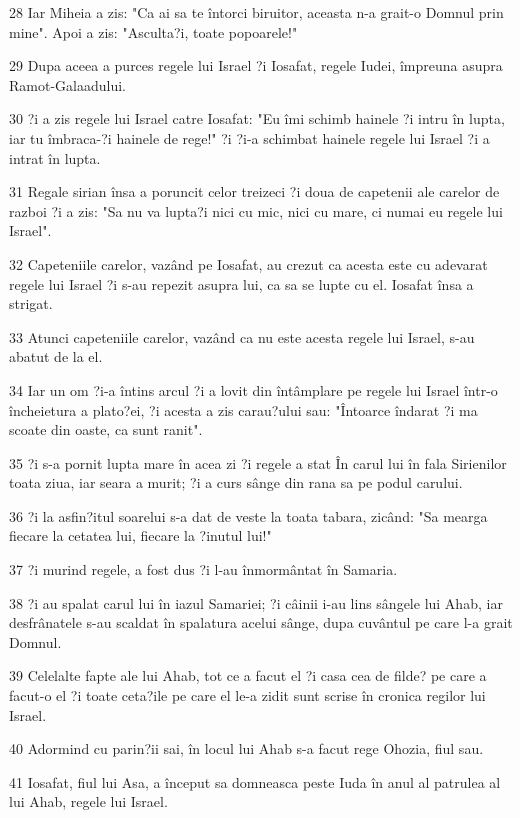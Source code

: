 \par 28 Iar Miheia a zis: "Ca ai sa te întorci biruitor, aceasta n-a grait-o Domnul prin mine". Apoi a zis: "Asculta?i, toate popoarele!"
\par 29 Dupa aceea a purces regele lui Israel ?i Iosafat, regele Iudei, împreuna asupra Ramot-Galaadului.
\par 30 ?i a zis regele lui Israel catre Iosafat: "Eu îmi schimb hainele ?i intru în lupta, iar tu îmbraca-?i hainele de rege!" ?i ?i-a schimbat hainele regele lui Israel ?i a intrat în lupta.
\par 31 Regale sirian însa a poruncit celor treizeci ?i doua de capetenii ale carelor de razboi ?i a zis: "Sa nu va lupta?i nici cu mic, nici cu mare, ci numai eu regele lui Israel".
\par 32 Capeteniile carelor, vazând pe Iosafat, au crezut ca acesta este cu adevarat regele lui Israel ?i s-au repezit asupra lui, ca sa se lupte cu el. Iosafat însa a strigat.
\par 33 Atunci capeteniile carelor, vazând ca nu este acesta regele lui Israel, s-au abatut de la el.
\par 34 Iar un om ?i-a întins arcul ?i a lovit din întâmplare pe regele lui Israel într-o încheietura a plato?ei, ?i acesta a zis carau?ului sau: "Întoarce îndarat ?i ma scoate din oaste, ca sunt ranit".
\par 35 ?i s-a pornit lupta mare în acea zi ?i regele a stat În carul lui în fala Sirienilor toata ziua, iar seara a murit; ?i a curs sânge din rana sa pe podul carului.
\par 36 ?i la asfin?itul soarelui s-a dat de veste la toata tabara, zicând: "Sa mearga fiecare la cetatea lui, fiecare la ?inutul lui!"
\par 37 ?i murind regele, a fost dus ?i l-au înmormântat în Samaria.
\par 38 ?i au spalat carul lui în iazul Samariei; ?i câinii i-au lins sângele lui Ahab, iar desfrânatele s-au scaldat în spalatura acelui sânge, dupa cuvântul pe care l-a grait Domnul.
\par 39 Celelalte fapte ale lui Ahab, tot ce a facut el ?i casa cea de filde? pe care a facut-o el ?i toate ceta?ile pe care el le-a zidit sunt scrise în cronica regilor lui Israel.
\par 40 Adormind cu parin?ii sai, în locul lui Ahab s-a facut rege Ohozia, fiul sau.
\par 41 Iosafat, fiul lui Asa, a început sa domneasca peste Iuda în anul al patrulea al lui Ahab, regele lui Israel.
